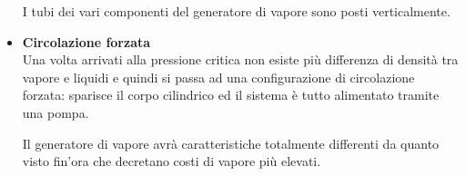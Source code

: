 \begin{adjustwidth}{2in}{}
\begin{itemize}
				I tubi dei vari componenti del generatore di vapore sono posti verticalmente.  
				
				\item \textbf{Circolazione forzata}\\
				Una volta arrivati alla pressione critica non esiste più differenza di densità tra vapore e liquidi e quindi si passa ad una configurazione di circolazione forzata: sparisce il corpo cilindrico ed il sistema è tutto alimentato tramite una pompa.
				
				Il generatore di vapore avrà caratteristiche totalmente differenti da quanto visto fin'ora che decretano costi di vapore più elevati. 
			\end{itemize}			
\end{adjustwidth}